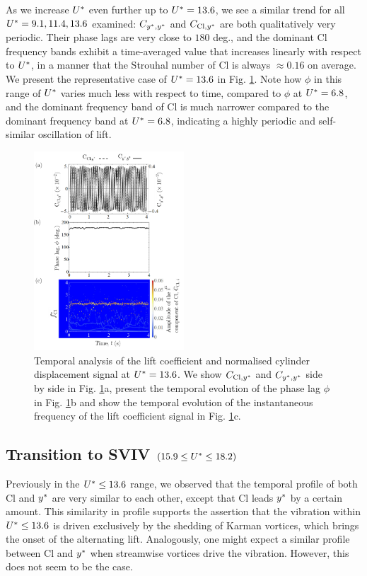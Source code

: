 \documentclass[a4paper,fleqn]{cas-sc}
\begin{document}
As we increase $U^{*}$ even further up to $U^{*} = 13.6$, we see a similar trend for all $U^{*} = 9.1, 11.4, 13.6$ examined: $C_{y^{*},y^{*}}$ and $C_{\text{Cl},y^{*}}$ are both qualitatively very periodic. Their phase lags are very close to $180$ deg., and the dominant Cl frequency bands exhibit a time-averaged value that increases linearly with respect to $U^{*}$, in a manner that the Strouhal number of Cl is always $\approx 0.16$ on average. We present the representative case of $U^{*} = 13.6$ in Fig. \ref{fig:tempAnalysisLower}. Note how $\phi$ in this range of $U^{*}$ varies much less with respect to time, compared to $\phi$ at $U^{*} = 6.8$, and the dominant frequency band of Cl is much narrower compared to the dominant frequency band at $U^{*} = 6.8$, indicating a highly periodic and self-similar oscillation of lift.

\begin{figure}
  \centering
  \includegraphics[width=0.5\textwidth]{figs/figure14}
  \caption{Temporal analysis of the lift coefficient and normalised cylinder displacement signal at $U^{*} = 13.6$. We show $C_{\text{Cl},y^{*}}$ and $C_{y^{*},y^{*}}$ side by side in Fig. \ref{fig:tempAnalysisLower}a, present the temporal evolution of the phase lag $\phi$ in Fig. \ref{fig:tempAnalysisLower}b and show the temporal evolution of the instantaneous frequency of the lift coefficient signal in Fig. \ref{fig:tempAnalysisLower}c.} \label{fig:tempAnalysisLower}
\end{figure}

\subsection{Transition to SVIV $\left (15.9 \leq U^{*} \leq 18.2 \right )$} \label{ssec:transSVIV}
Previously in the $U^{*} \leq 13.6$ range, we observed that the temporal profile of both Cl and  $y^{*}$ are very similar to each other, except that Cl leads $y^{*}$ by a certain amount. This similarity in profile supports the assertion that the vibration within $U^{*} \leq 13.6$ is driven exclusively by the shedding of Karman vortices, which brings the onset of the alternating lift. Analogously, one might expect a similar profile between Cl and $y^{*}$ when streamwise vortices drive the vibration. However, this does not seem to be the case.
\end{document}
